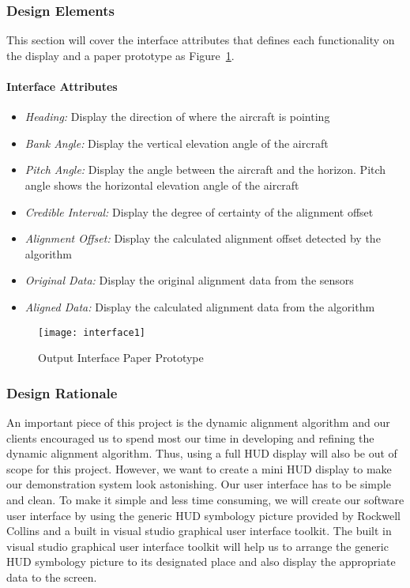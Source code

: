 		\subsubsection{Design Elements}
		This section will cover the interface attributes that defines each functionality on the display and a paper prototype as Figure~\ref{fig:interface1}.

			\paragraph{Interface Attributes}
			\begin{itemize}
				\item \textit{Heading:} Display the direction of where the aircraft is pointing  
				\item \textit{Bank Angle:} Display the vertical elevation angle of the aircraft
				\item \textit{Pitch Angle:}  Display the angle between the aircraft and the horizon. Pitch angle shows the horizontal elevation angle of the aircraft 
				\item \textit{Credible Interval:} Display the degree of certainty of the alignment offset 
				\item \textit{Alignment Offset:} Display the calculated alignment offset detected by the algorithm 
				\item \textit{Original Data:} Display the original alignment data from the sensors 
				\item \textit{Aligned Data:} Display the calculated alignment data from the algorithm 
			\end{itemize}

			\begin{figure}[h]
				\centering
			 		\caption{Output Interface Paper Prototype}			%
			      	\texttt{[image: interface1]}
			    \label{fig:interface1}
			\end{figure}

		\subsubsection{Design Rationale}
		An important piece of this project is the dynamic alignment algorithm and our clients encouraged us to spend most our time in developing and refining the dynamic alignment algorithm. Thus, using a full HUD display will also be out of scope for this project. However, we want to create a mini HUD display to make our demonstration system look astonishing. Our user interface has to be simple and clean. To make it simple and less time consuming, we will create our software user interface by using the generic HUD symbology picture provided by Rockwell Collins and a built in visual studio graphical user interface toolkit. The built in visual studio graphical user interface toolkit will help us to arrange the generic HUD symbology picture to its designated place and also display the appropriate data to the screen. 

